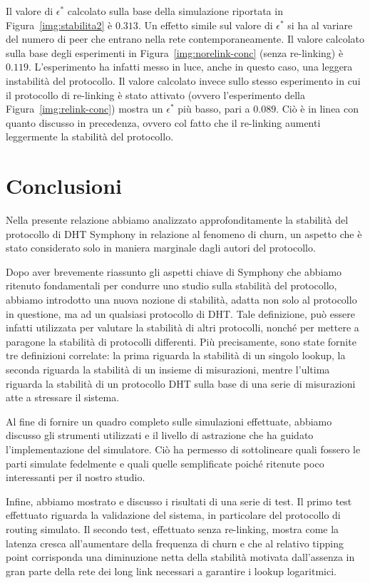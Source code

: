 \documentclass[prodmode,acmtap]{acmlarge}
\begin{document}
Il valore di $\epsilon^*$ calcolato sulla base della simulazione riportata in Figura~\ref{img:stabilita2} è $0.313$.
Un effetto simile sul valore di $\epsilon^*$ si ha al variare del numero di peer che entrano nella rete contemporaneamente. Il valore calcolato sulla base degli esperimenti in Figura~\ref{img:norelink-conc} (senza re-linking) è $0.119$. L'esperimento ha infatti messo in luce, anche in questo caso, una leggera instabilità del protocollo. Il valore calcolato invece sullo stesso esperimento in cui il protocollo di re-linking è stato attivato (ovvero l'esperimento della Figura~\ref{img:relink-conc}) mostra un $\epsilon^*$ più basso, pari a $0.089$. Ciò è in linea con quanto discusso in precedenza, ovvero col fatto che il re-linking aumenti leggermente la stabilità del protocollo.



\section{Conclusioni} \label{conclusioni}

Nella presente relazione abbiamo analizzato approfonditamente la stabilità del protocollo di DHT Symphony in relazione al fenomeno di churn, un aspetto che è stato considerato solo in maniera marginale dagli autori del protocollo. 

Dopo aver brevemente riassunto gli aspetti chiave di Symphony che abbiamo ritenuto fondamentali per condurre uno studio sulla stabilità del protocollo,
abbiamo introdotto una nuova nozione di stabilità, adatta non solo al protocollo in questione, ma ad un qualsiasi protocollo di DHT. Tale definizione, può essere infatti utilizzata per valutare la stabilità di altri protocolli, nonché per mettere a paragone la stabilità di protocolli differenti. Più precisamente, sono state fornite tre definizioni correlate: la prima riguarda la stabilità di un singolo lookup, la seconda riguarda la stabilità di un insieme di misurazioni, mentre l'ultima riguarda la stabilità di un protocollo DHT sulla base di una serie di misurazioni atte a stressare il sistema.

Al fine di fornire un quadro completo sulle simulazioni effettuate, abbiamo discusso gli strumenti utilizzati e il livello di astrazione che ha guidato l'implementazione del simulatore. Ciò ha permesso di sottolineare quali fossero le parti simulate fedelmente e quali quelle semplificate poiché ritenute poco interessanti per il nostro studio.

Infine, abbiamo mostrato e discusso i risultati di una serie di test. Il primo test effettuato riguarda la validazione del sistema, in particolare del protocollo di routing simulato. Il secondo test, effettuato senza re-linking, mostra come la latenza cresca all'aumentare della frequenza di churn e che al relativo tipping point corrisponda una diminuzione netta della stabilità motivata dall'assenza in gran parte della rete dei long link necessari a garantire i lookup logaritmici.
\end{document}
